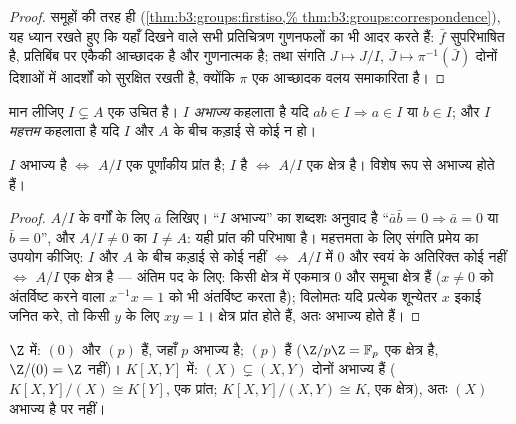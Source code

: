 \begin{proof}
समूहों की तरह ही (\cref{thm:b3:groups:firstiso,%
thm:b3:groups:correspondence}), यह ध्यान रखते हुए कि यहाँ दिखने वाले सभी
प्रतिचित्रण गुणनफलों का भी आदर करते हैं: $\bar f$ सुपरिभाषित है,
प्रतिबिंब पर एकैकी आच्छादक है और गुणनात्मक है; तथा संगति $J \mapsto J/I$,
$\bar J \mapsto \pi^{-1}(\bar J)$ दोनों दिशाओं में आदर्शों को सुरक्षित रखती है, क्योंकि $\pi$
एक आच्छादक वलय समाकारिता है।
\end{proof}

\begin{definition}\label{def:b3:rings:primemaximal}
मान लीजिए $I \subsetneq A$ एक उचित  है। $I$
\emph{अभाज्य} कहलाता है यदि $ab \in I \Rightarrow a \in I$ या $b \in I$;
और $I$ \emph{महत्तम} कहलाता है यदि $I$
और $A$ के बीच कड़ाई से कोई  न हो।
\end{definition}

\begin{proposition}\label{prop:b3:rings:primemaximal}
$I$ अभाज्य है $\iff$ $A/I$ एक पूर्णांकीय प्रांत है; $I$  है
$\iff$ $A/I$ एक क्षेत्र है। विशेष रूप से  अभाज्य होते
हैं।
\end{proposition}

\begin{proof}
$A/I$ के वर्गों के लिए $\bar a$ लिखिए। ``$I$ अभाज्य'' का शब्दशः
अनुवाद है ``$\bar a\bar b = 0 \Rightarrow \bar a = 0$ या $\bar b
= 0$'', और $A/I \neq 0$ का $I \neq A$: यही प्रांत की
परिभाषा है। महत्तमता के लिए संगति प्रमेय का उपयोग कीजिए: $I$
और $A$ के बीच कड़ाई से कोई  नहीं $\iff$ $A/I$ में $0$ और
स्वयं के अतिरिक्त कोई  नहीं $\iff$ $A/I$ एक क्षेत्र है ---
अंतिम पद के लिए: किसी क्षेत्र में एकमात्र  $0$ और समूचा
क्षेत्र हैं ($x \ne 0$ को अंतर्विष्ट करने वाला  $x^{-1}x = 1$ को भी
अंतर्विष्ट करता है); विलोमतः यदि प्रत्येक शून्येतर $x$ इकाई
 जनित करे, तो किसी $y$ के लिए $xy = 1$। क्षेत्र प्रांत होते
हैं, अतः  अभाज्य होते हैं।
\end{proof}

\begin{example}\label{ex:b3:rings:primemaximal}
$\Z$ में:  $(0)$ और $(p)$ हैं, जहाँ $p$ अभाज्य है;
 $(p)$ हैं ($\Z/p\Z = \mathbb F_p$ एक क्षेत्र है, $\Z/(0) = \Z$ नहीं)। $K[X, Y]$
में: $(X) \subsetneq (X, Y)$ दोनों अभाज्य हैं ($K[X,Y]/(X) \cong K[Y]$, एक प्रांत; $K[X,Y]/(X,Y) \cong K$, एक क्षेत्र),
अतः $(X)$ अभाज्य है पर  नहीं।
\end{example}

